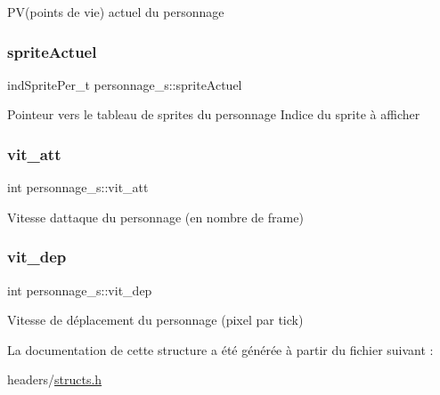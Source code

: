 P\+V(points de vie) actuel du personnage \mbox{\label{structpersonnage__s_a31cfe3f9dacab7ae783fc557cd0a0adf}} 
\subsubsection{\texorpdfstring{sprite\+Actuel}{spriteActuel}}
{\footnotesize\ttfamily ind\+Sprite\+Per\+\_\+t personnage\+\_\+s\+::sprite\+Actuel}

Pointeur vers le tableau de sprites du personnage Indice du sprite à afficher \mbox{\label{structpersonnage__s_a0022973bab638a02774a19710cedcd17}} 
\subsubsection{\texorpdfstring{vit\+\_\+att}{vit\_att}}
{\footnotesize\ttfamily int personnage\+\_\+s\+::vit\+\_\+att}

Vitesse d\textquotesingle{}attaque du personnage (en nombre de frame) \mbox{\label{structpersonnage__s_a6899a0efdc3a3fccb060aaf06b4e4b8d}} 
\subsubsection{\texorpdfstring{vit\+\_\+dep}{vit\_dep}}
{\footnotesize\ttfamily int personnage\+\_\+s\+::vit\+\_\+dep}

Vitesse de déplacement du personnage (pixel par tick) 

La documentation de cette structure a été générée à partir du fichier suivant \+:\begin{DoxyCompactItemize}
\item 
headers/\hyperlink{structs_8h}{structs.\+h}\end{DoxyCompactItemize}
